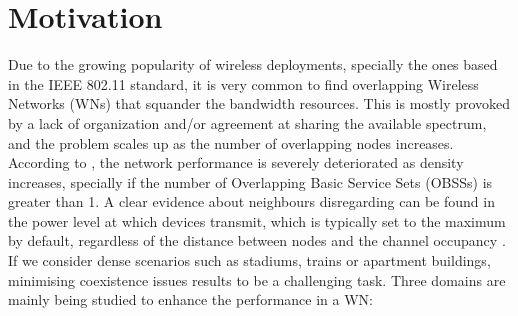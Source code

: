 \documentclass[12pt, a4paper,twoside]{tesi_upf}
\begin{document}
		\section{Motivation}
		\label{section:motivation}
			Due to the growing popularity of wireless deployments, specially the ones based in the IEEE 802.11 standard, it is very common to find overlapping Wireless Networks (WNs) that squander the bandwidth resources. This is mostly provoked by a lack of organization and/or agreement at sharing the available spectrum, and the problem scales up as the number of overlapping nodes increases. According to \cite{zhong2015issues}, the network performance is severely deteriorated as density increases, specially if the number of Overlapping Basic Service Sets (OBSSs) is greater than 1. A clear evidence about neighbours disregarding can be found in the power level at which devices transmit, which is typically set to the maximum by default, regardless of the distance between nodes and the channel occupancy \cite{akella2007self}. If we consider dense scenarios such as stadiums, trains or apartment buildings, minimising coexistence issues results to be a challenging task. Three domains are mainly being studied to enhance the performance in a WN:
\end{document}

